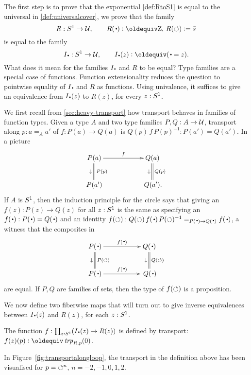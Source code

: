 The first step is to prove that the exponential \covering \cref{def:RtoS1} 
is equal to the universal \covering in \cref{def:universalcover}, 
\ie we prove that the family 
\[
R: \Sc\to\UU,\qquad R(\base)\defeq\zet,\, R(\Sloop)\defis \etop{s}
\]
is equal to the family
\[
\uc{\base}:\Sc\to\UU,\qquad \uc{\base}(z)\defeq (\base=z).
\]
What does it mean for the families $\uc{\base}$ and $R$ to be equal?
Type families are a special case of functions. 
Function extensionality reduces the question to pointwise equality
of $\uc{\base}$ and $R$ as functions.
Using univalence, it suffices to give
an equivalence from $\uc{\base}(z)$ to $R(z)$, for every $z:{S^1}$.


We first recall from \cref{sec:heavy-transport} how 
transport behaves in families of function types.  
Given a type $A$ and two type families $P,Q:A\to\mathcal{U}$, 
transport along $p:a=_Aa'$ of $f:P(a)\to Q(a)$ is $Q(p)\,f\,P(p)^{-1}:P(a')=Q(a')$.
In a picture
\[
\xymatrix{
P(a)\ar[rr]^{f}\ar@{=}[d]^{P(p)}_\downarrow&&
  Q(a)\ar@{=}[d]^{Q(p)}_\downarrow\\
P(a')&&\,Q(a').}
\]
If $A$ is ${S^1}$, then the induction principle for the circle says 
that giving an $f(z):P(z)\to Q(z)$ for all $z:{S^1}$ is the same as 
specifying an $f(\base):P(\base)=Q(\base)$ and an identity 
$f(\Sloop):Q(\Sloop)\,f(\base)\,P(\Sloop)^{-1}=_{P(\base)\to Q(\base)}f(\base)$,
\ie a witness that the composites in 
$$\xymatrix{
  P(\base)\ar[rr]^{f(\base)}\ar@{=}[d]^{P(\Sloop)}_\downarrow
 &&Q(\base)\ar@{=}[d]^{Q(\Sloop)}_\downarrow\\
  P(\base)\ar[rr]^{f(\base)}&&\,Q(\base)}
$$
are equal.  If $P,Q$ are families of sets, 
then the type of $f(\circlearrowleft)$ is a proposition.

We now define two fiberwise maps that will turn out to give
inverse equivalences between $\uc{\base}(z)$ and $R(z)$, for each $z:{S^1}$.

\begin{definition}
  \label{def:fPtoR}
  The function $f:\prod_{z:\Sc}(\uc{\base}(z)\to R(z))$ is defined by transport: $f(z)(p)\defequi\trp{R,p}(0)$.
\end{definition}

In Figure~\ref{fig:transportalongloop}, the transport in the definition
above has been visualised for $p={\circlearrowleft^n}$, $n=-2,-1,0,1,2$.

